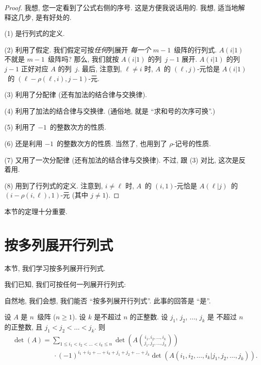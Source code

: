 \begin{proof}
    我想, 您一定看到了公式右侧的序号.
    这是方便我说话用的.
    我想, 适当地解释这几步,
    是有好处的.

    (1) 是行列式的定义.

    (2) 利用了假定.
    我们假定可按\emph{任何}列展开%
    \emph{每一个} \(m - 1\)~级阵的行列式.
    \(A(i|1)\) 不就是 \(m - 1\)~级阵吗?
    那么, 我们就按 \(A(i|1)\) 的列~\(j - 1\) 展开.
    \(A(i|1)\) 的列~\(j - 1\) 正好对应
    \(A\) 的列~\(j\).
    最后, 注意到, \(\ell \neq i\) 时,
    \(A\)~的 \((\ell, j)\)-元恰是
    \(A(i|1)\)~的 \((\ell - \rho(\ell, i), j - 1)\)-元.

    (3) 利用了分配律 (还有加法的结合律与交换律).

    (4) 利用了加法的结合律与交换律.
    (通俗地, 就是 ``求和号的次序可换''.)

    (5) 利用了 \(-1\)~的整数次方的性质.

    (6) 还是利用 \(-1\)~的整数次方的性质.
    当然了, 也用到了 \(\rho\)-记号的性质.

    (7) 又用了一次分配律 (还有加法的结合律与交换律).
    不过, 跟 (3) 对比, 这次是反着用.

    (8) 用到了行列式的定义.
    注意到, \(i \neq \ell\) 时,
    \(A\)~的 \((i, 1)\)-元恰是
    \(A(\ell|j)\)~的 \((i - \rho(i, \ell), 1)\)-元
    (其中 \(j \neq 1\)).
\end{proof}

本节的定理十分重要.

\KunAsteriskoEnEnhavtabelo
\section{按多列展开行列式}
\SenAsteriskoEnEnhavtabelo

\maldevigalegajxo

本节, 我们学习按多列展开行列式.

我们已知, 我们可按任何一列展开行列式:

\TheoremExpansionAboutAnyColumn*

自然地, 我们会想, 我们能否 ``按多列展开行列式''.
此事的回答是 ``是''.

\begin{theorem}
    设 \(A\) 是 \(n\)~级阵 (\(n \geq 1\)).
    设 \(k\) 是不超过 \(n\) 的正整数.
    设 \(j_1\), \(j_2\), \(\dots\), \(j_k\) 是%
    不超过 \(n\) 的正整数,
    且 \(j_1 < j_2 < \dots < j_k\).
    则
    \begin{align*}
         &
        \det {(A)}
        = \sum_{1 \leq i_1 < i_2 < \dots < i_k \leq n}
        {\det {\left(
                A\binom{i_1, i_2, \dots, i_k}
                {j_1, j_2, \dots, j_k}
                \right)}}
        \\
         &
        \qquad \qquad \qquad
        \cdot (-1)^{i_1 + i_2 + \dots + i_k
            + j_1 + j_2 + \dots + j_k}
        \det {(A({i_1,i_2,\dots,i_k}|{j_1,j_2,\dots,j_k}))}.
    \end{align*}
\end{theorem}

